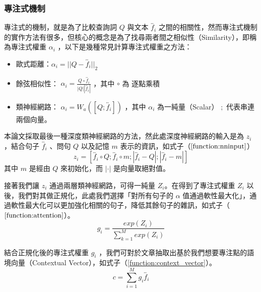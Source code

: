 \subsubsection{專注式機制}
專注式的機制，就是為了比較查詢詞 $Q$ 與文本 $\overleftrightarrow{f_i}$ 之間的相關性，然而專注式機制的實作方法有很多，但核心的概念是為了找尋兩者間之相似性（Similarity），即稱為專注式權重 $\alpha_i$ ，以下是幾種常見計算專注式權重之方法：
\itemsep -4pt
\begin{itemize}
    \item 歐式距離：$\alpha_i = ||Q-\overleftrightarrow{f_i}||_{2}$
    \item 餘弦相似性：
            $\alpha_i = \frac{Q \circ \overleftrightarrow{f_i} }{|Q| |\overleftrightarrow{f_i}| } $ 
            ，其中 $\circ$ 為 逐點乘積
    \item 類神經網路： $\alpha_i = W_a ([Q ; \overleftrightarrow{f_i}]) $ 
        ，其中 $\alpha_i$ 為一純量（Scalar） $;$ 代表串連兩個向量。
\end{itemize}
本論文採取最後一種深度類神經網路的方法，然此處深度神經網路的輸入是為 $z_i$ ，結合句子 $\overleftrightarrow{f_i}$ 、問句 $Q$ 以及記憶 $m$ 表示的資訊，如式子（$\ref{function:nninput}$）
\begin{equation}
    z_i = [ \overleftrightarrow{f_i} \circ Q ; \overleftrightarrow{f_i} \circ m ; |\overleftrightarrow{f_i} - Q| ; | \overleftrightarrow{f_i} - m| ] \label{function:nninput}
\end{equation}
其中 $m$ 是經由 $Q$ 來初始化，而 $|\cdot|$ 是向量取絕對值。

接著我們讓 $z_i$ 通過兩層類神經網路，可得一純量 $Z_i$。在得到了專注式權重 $Z_i$ 以後，我們對其做正規化，此處我們選擇「對所有句子的 $\alpha$ 值通過軟性最大化」，通過軟性最大化可以更加強化相關的句子，降低其餘句子的雜訊，如式子（$\ref{function:attention}$）。
\begin{equation}
    g_i = \frac{exp{(Z_i)}}{\sum_{k=1}^{M} exp(Z_i)} \label{function:attention}
\end{equation}

結合正規化後的專注式權重 $g_i$ ，我們可對於文章抽取出基於我們想要專注點的語境向量（Contextual Vector），如式子（\ref{function:context_vector}）。
\begin{equation}
    c = \sum_{i=1}^{M} g_i \overleftrightarrow{f_i} \label{function:context_vector}
\end{equation}
